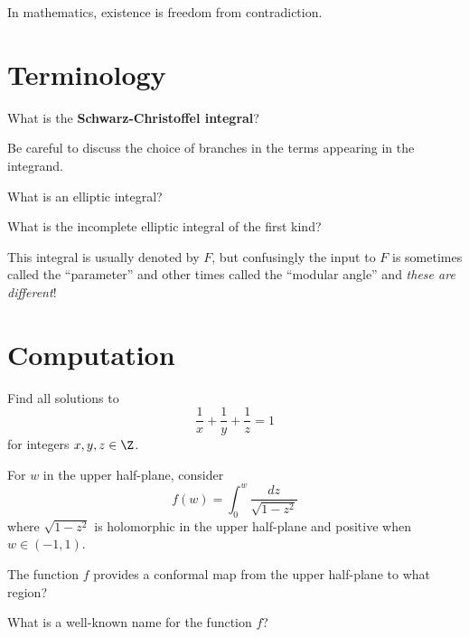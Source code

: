 \documentclass{homework}
\author{Jim Fowler}
\begin{document}
\maketitle

\begin{inspiration}
In mathematics, existence is freedom from contradiction.
\end{inspiration}

\section{Terminology}

\begin{problem}
  What is the \textbf{Schwarz-Christoffel integral}?

  Be careful to discuss the choice of branches in the terms appearing
  in the integrand.
\end{problem}

\begin{problem}
  What is an elliptic integral?
\end{problem}

\begin{problem}
  What is the incomplete elliptic integral of the first kind?

  This integral is usually denoted by $F$, but confusingly the input
  to $F$ is sometimes called the ``parameter'' and other times called
  the ``modular angle'' and \textit{these are different}!
\end{problem}

\section{Computation}

\begin{problem}
  Find all solutions to
  \[
    \frac{1}{x} + \frac{1}{y} + \frac{1}{z} = 1
  \]
  for integers $x,y,z \in \Z$.
\end{problem}

\begin{problem}
  For $w$ in the upper half-plane, consider
  \[
    f(w) = \int_0^w  \frac{dz}{\sqrt{1-z^2}}
  \]
  where $\sqrt{1-z^2}$ is holomorphic in the upper half-plane and positive when $w \in (-1,1)$.

  The function $f$ provides a conformal map from the upper half-plane to what region?

  What is a well-known name for the function $f$?
\end{problem}
\end{document}
